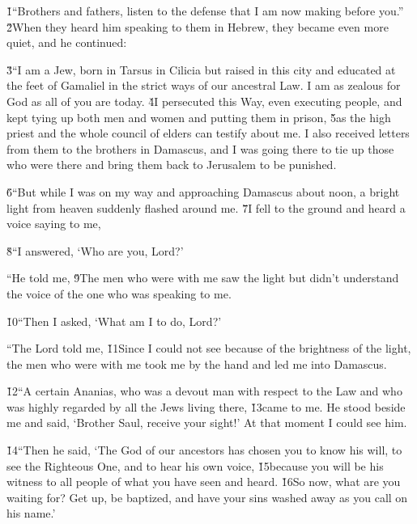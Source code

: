 \v{1}``Brothers and fathers, listen to the defense that I am now making before you.'' \v{2}When they heard him speaking to them in Hebrew, they became even more quiet, and he continued:

\v{3}``I am a Jew, born in Tarsus in Cilicia but raised in this city and educated at the feet of Gamaliel in the strict ways of our ancestral Law. I am as zealous for God as all of you are today. \v{4}I persecuted this Way, even executing people, and kept tying up both men and women and putting them in prison, \v{5}as the high priest and the whole council of elders can testify about me. I also received letters from them to the brothers in Damascus, and I was going there to tie up those who were there and bring them back to Jerusalem to be punished.

\v{6}``But while I was on my way and approaching Damascus about noon, a bright light from heaven suddenly flashed around me. \v{7}I fell to the ground and heard a voice saying to me, 

\v{8}``I answered, `Who are you, Lord?'

``He told me,  \v{9}The men who were with me saw the light but didn't understand the voice of the one who was speaking to me.

\v{10}``Then I asked, `What am I to do, Lord?'

``The Lord told me,  \v{11}Since I could not see because of the brightness of the light, the men who were with me took me by the hand and led me into Damascus.

\v{12}``A certain Ananias, who was a devout man with respect to the Law and who was highly regarded by all the Jews living there, \v{13}came to me. He stood beside me and said, `Brother Saul, receive your sight!' At that moment I could see him.

\v{14}``Then he said, `The God of our ancestors has chosen you to know his will, to see the Righteous One, and to hear his own voice, \v{15}because you will be his witness to all people of what you have seen and heard. \v{16}So now, what are you waiting for? Get up, be baptized, and have your sins washed away as you call on his name.'

